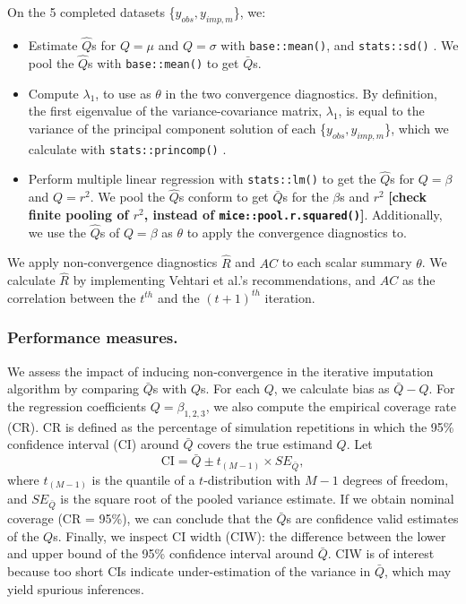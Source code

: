 \documentclass[Royal,times,sageh]{sagej}
\begin{document}
On the 5 completed datasets \{\(y_{obs}, y_{imp, m}\)\}, we:

\begin{itemize}
\item
  Estimate \(\hat{Q}\)s for \(Q= \mu\) and \(Q=\sigma\) with \texttt{base::mean()}, and \texttt{stats::sd()} \citep{R}. We pool the \(\hat{Q}\)s with \texttt{base::mean()} to get \(\bar{Q}\)s.
\item
  Compute \(\lambda_1\), to use as \(\theta\) in the two convergence diagnostics. By definition, the first eigenvalue of the variance-covariance matrix, \(\lambda_1\), is equal to the variance of the principal component solution of each \{\(y_{obs}, y_{imp, m}\)\}, which we calculate with \texttt{stats::princomp()} \citep{R}.
\item
  Perform multiple linear regression with \texttt{stats::lm()} \citep{R} to get the \(\hat{Q}\)s for \(Q=\beta\) and \(Q=r^2\). We pool the \(\hat{Q}\)s conform \citet{vink14} to get \(\bar{Q}\)s for the \(\beta\)s and \(r^2\) \textbf{{[}check finite pooling of \(r^2\), instead of \texttt{mice::pool.r.squared()}{]}}. Additionally, we use the \(\hat{Q}\)s of \(Q=\beta\) as \(\theta\) to apply the convergence diagnostics to.
\end{itemize}

We apply non-convergence diagnostics \(\widehat{R}\) and \(AC\) to each scalar summary \(\theta\). We calculate \(\widehat{R}\) by implementing Vehtari et al.'s \citeyearpar{veht19} recommendations, and \(AC\) as the correlation between the \(t^{th}\) and the \((t+1)^{th}\) iteration.

\hypertarget{performance-measures.}{%
\subsubsection{Performance measures.}\label{performance-measures.}}

We assess the impact of inducing non-convergence in the iterative imputation algorithm by comparing \(\bar{Q}\)s with \(Q\)s. For each \(Q\), we calculate bias as \(\bar{Q} - Q\). For the regression coefficients \(Q=\beta_{1,2,3}\), we also compute the empirical coverage rate (CR). CR is defined as the percentage of simulation repetitions in which the 95\% confidence interval (CI) around \(\bar{Q}\) covers the true estimand \(Q\). Let
\[\text{CI} = \bar{Q} \pm t_{(M-1)} \times SE_{\bar{Q}},\]
where \(t_{(M-1)}\) is the quantile of a \(t\)-distribution with \(M-1\) degrees of freedom, and \(SE_{\bar{Q}}\) is the square root of the pooled variance estimate. If we obtain nominal coverage (CR = 95\%), we can conclude that the \(\bar{Q}\)s are confidence valid estimates of the \(Q\)s. Finally, we inspect CI width (CIW): the difference between the lower and upper bound of the 95\% confidence interval around \(\bar{Q}\). CIW is of interest because too short CIs indicate under-estimation of the variance in \(\bar{Q}\), which may yield spurious inferences.
\end{document}
